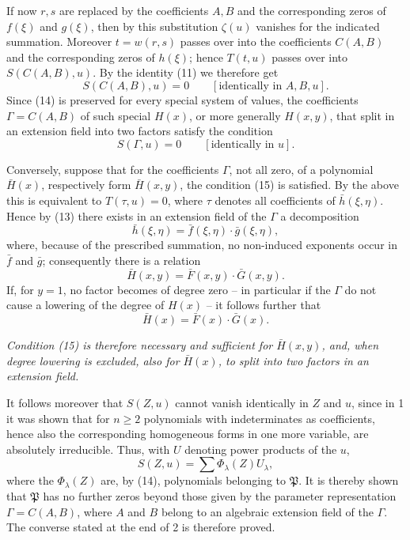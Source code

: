 If now $r,s$ are replaced by the coefficients $A,B$ and the corresponding zeros of $f(\xi)$ and $g(\xi)$, then by this substitution $\zeta(u)$ vanishes for the indicated summation. Moreover $t=w(r,s)$ passes over into the coefficients $C(A,B)$ and the corresponding zeros of $h(\xi)$; hence $T(t,u)$ passes over into $S(C(A,B),u)$. By the identity (11) we therefore get
\begin{equation}
 S(C(A,B),u)=0\qquad[\text{identically in }A,B,u].
\tag{14}
\end{equation}
Since (14) is preserved for every special system of values, the coefficients $\Gamma=C(A,B)$ of such special $H(x)$, or more generally $H(x,y)$, that split in an extension field into two factors satisfy the condition
\begin{equation}
 S(\Gamma,u)=0\qquad[\text{identically in }u].
\tag{15}
\end{equation}

Conversely, suppose that for the coefficients $\Gamma$, not all zero, of a polynomial $\bar H(x)$, respectively form $\bar H(x,y)$, the condition (15) is satisfied. By the above this is equivalent to $T(\tau,u)=0$, where $\tau$ denotes all coefficients of $\bar h(\xi,\eta)$. Hence by (13) there exists in an extension field of the $\Gamma$ a decomposition
\[
 \bar h(\xi,\eta)=\bar f(\xi,\eta)\cdot\bar g(\xi,\eta),
\]
where, because of the prescribed summation, no non-induced exponents occur in $\bar f$ and $\bar g$; consequently there is a relation
\[
 \bar H(x,y)=\bar F(x,y)\cdot\bar G(x,y).
\]
If, for $y=1$, no factor becomes of degree zero -- in particular if the $\Gamma$ do not cause a lowering of the degree of $H(x)$ -- it follows further that
\[
 \bar H(x)=\bar F(x)\cdot\bar G(x).
\]

\emph{Condition (15) is therefore necessary and sufficient for $\bar H(x,y)$, and, when degree lowering is excluded, also for $\bar H(x)$, to split into two factors in an extension field.}

It follows moreover that $S(Z,u)$ cannot vanish identically in $Z$ and $u$, since in 1 it was shown that for $n\ge2$ polynomials with indeterminates as coefficients, hence also the corresponding homogeneous forms in one more variable, are absolutely irreducible. Thus, with $U$ denoting power products of the $u$,
\[
 S(Z,u)=\sum \Phi_\lambda(Z)U_\lambda,
\]
where the $\Phi_\lambda(Z)$ are, by (14), polynomials belonging to $\mathfrak P$. It is thereby shown that $\mathfrak P$ has no further zeros beyond those given by the parameter representation $\Gamma=C(A,B)$, where $A$ and $B$ belong to an algebraic extension field of the $\Gamma$. The converse stated at the end of 2 is therefore proved.

